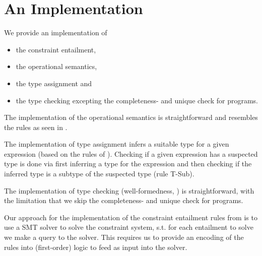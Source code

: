 \documentclass[a4paper]{article}
\begin{document}
\section{An Implementation}

We provide an implementation of
\begin{itemize}
  \item the constraint entailment,
  \item the operational semantics,
  \item the type assignment and
  \item the type checking excepting the completeness- and unique check for programs.
\end{itemize}

The implementation of the operational semantics is straightforward and resembles
the rules as seen in .

The implementation of type assignment infers a suitable type for a given expression
(based on the rules of ).
Checking if a given expression has a suspected type is done via
first inferring a type for the expression and then checking if the inferred type
is a subtype of the suspected type (rule T-Sub).

The implementation of type checking (well-formedness, ) is straightforward,
with the limitation that we skip the completeness- and unique check for programs.

Our approach for the implementation of the constraint entailment rules
from  is to use a SMT solver to solve the constraint system,
s.t. for each entailment to solve we make a query to the solver.
This requires us to provide an encoding of the rules into (first-order) logic
to feed as input into the solver.
\end{document}
